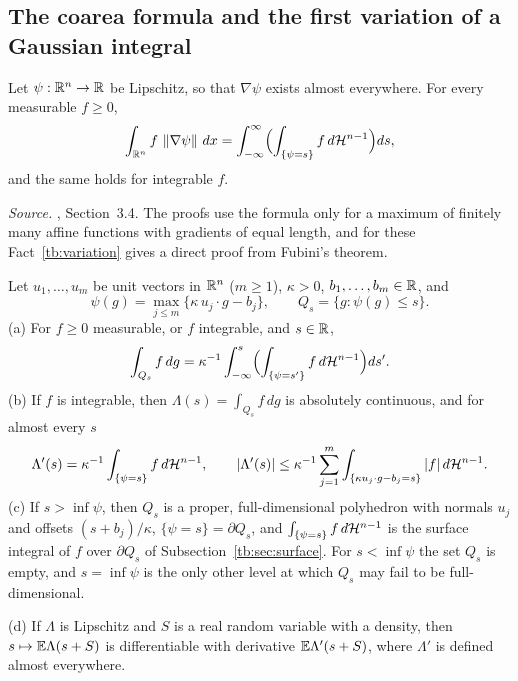 \subsection{The coarea formula and the first variation of a Gaussian
integral}\label{tb:sec:coarea}

\begin{fact}\label{tb:coarea}
Let \(\psi:\mathbb R^n\to\mathbb R\) be Lipschitz, so that \(\nabla\psi\) exists almost
everywhere. For every measurable \(f\ge0\),
\[
 \int_{\mathbb R^n}f\,\left\lVert\nabla\psi\right\rVert\,dx=\int_{-\infty}^\infty
 \Bigl(\int_{\{\psi=s\}}f\,d\mathcal H^{n-1}\Bigr)ds ,
\]
and the same holds for integrable \(f\).
\end{fact}

\emph{Source.} , Section~3.4. The proofs use the formula only for
a maximum of finitely many affine functions with gradients of equal length, and
for these Fact~\ref{tb:variation} gives a direct proof from Fubini's theorem.

\begin{fact}\label{tb:variation}
Let \(u_1,\ldots,u_m\) be unit vectors in \(\mathbb R^n\) (\(m\ge1\)), \(\kappa>0\),
\(b_1,\ldots,b_m\in\mathbb R\), and
\[
 \psi(g)=\max_{j\le m}\{\kappa\,u_j\cdot g-b_j\},\qquad Q_s=\{g:\psi(g)\le s\}.
\]
(a) For \(f\ge0\) measurable, or \(f\) integrable, and \(s\in\mathbb R\),
\[
 \int_{Q_s}f\,dg=\kappa^{-1}\int_{-\infty}^s\Bigl(\int_{\{\psi=s'\}}f\,d\mathcal H^{n-1}
 \Bigr)ds'.
\]
(b) If \(f\) is integrable, then \(\Lambda(s)=\int_{Q_s}f\,dg\) is absolutely
continuous, and for almost every \(s\)
\[
 \Lambda'(s)=\kappa^{-1}\int_{\{\psi=s\}}f\,d\mathcal H^{n-1},\qquad
 |\Lambda'(s)|\le\kappa^{-1}\sum_{j=1}^m\int_{\{\kappa u_j\cdot g-b_j=s\}}|f|\,d\mathcal H^{n-1}.
\]
(c) If \(s>\inf\psi\), then \(Q_s\) is a proper, full-dimensional polyhedron
with normals \(u_j\) and offsets \((s+b_j)/\kappa\), \(\{\psi=s\}=\partial Q_s\),
and \(\int_{\{\psi=s\}}f\,d\mathcal H^{n-1}\) is the surface integral of \(f\) over
\(\partial Q_s\) of Subsection~\ref{tb:sec:surface}. For \(s<\inf\psi\) the set
\(Q_s\) is empty, and \(s=\inf\psi\) is the only other level at which \(Q_s\)
may fail to be full-dimensional.

(d) If \(\Lambda\) is Lipschitz and \(S\) is a real random variable with a
density, then \(s\mapsto\mathbb E\Lambda(s+S)\) is differentiable with derivative
\(\mathbb E\Lambda'(s+S)\), where \(\Lambda'\) is defined almost everywhere.
\end{fact}


